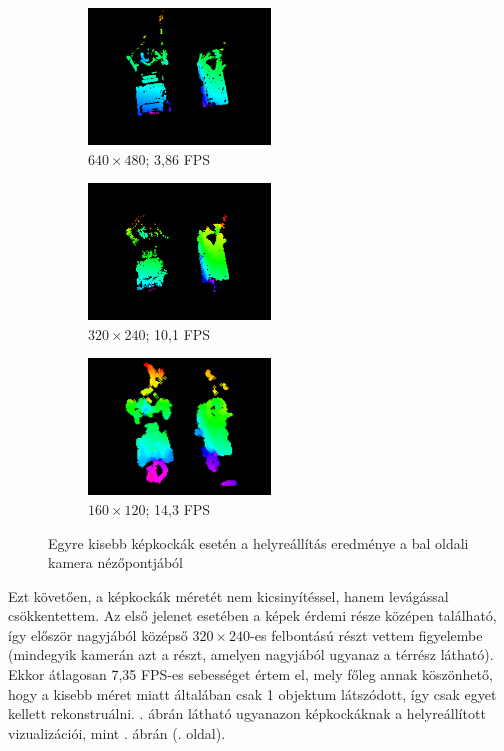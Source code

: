 \begin{figure}[tbh]
\centering
\begin{subfigure}[b]{.32\linewidth}
	\centering
	\includegraphics[width=137pt]{figures/vis_127_640.png}
	\caption{$640\times 480$; 3,86 FPS}
  \end{subfigure}
\begin{subfigure}[b]{.32\linewidth}
	\centering
	\includegraphics[width=137pt]{figures/vis_127_320.png}
	\caption{$320\times 240$; 10,1 FPS}
  \end{subfigure}
\begin{subfigure}[b]{.32\linewidth}
	\centering
	\includegraphics[width=137pt]{figures/vis_127_160.png}
	\caption{$160\times 120$; 14,3 FPS}
  \end{subfigure}
\caption{Egyre kisebb képkockák esetén a helyreállítás eredménye a bal oldali kamera nézőpontjából \label{fig:resize}}
\end{figure}

Ezt követően, a képkockák méretét nem kicsinyítéssel, hanem levágással csökkentettem. Az első jelenet esetében a képek érdemi része középen található, így először nagyjából középső $320\times 240$-es felbontású részt vettem figyelembe (mindegyik kamerán azt a részt, amelyen nagyjából ugyanaz a térrész látható). Ekkor átlagosan 7,35 FPS-es sebességet értem el, mely főleg annak köszönhető, hogy a kisebb méret miatt általában csak 1 objektum látszódott, így csak egyet kellett rekonstruálni. . ábrán látható ugyanazon képkockáknak a helyreállított vizualizációi, mint . ábrán (\pageref{fig:scene1_frames}. oldal).

